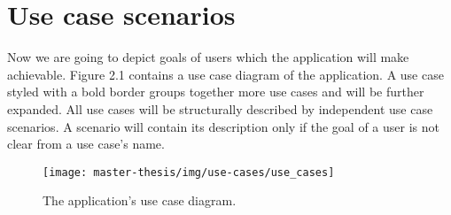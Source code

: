 \section{Use case scenarios}
Now we are going to depict goals of users which the application will make achievable.
Figure 2.1 contains a use case diagram of the application.
A use case styled with a bold border groups together more use cases and will be further expanded.
All use cases will be structurally described by independent use case scenarios.
A scenario will contain its description only if the goal of a user is not clear from a use case's name.

\begin{figure}[h]
  \texttt{[image: master-thesis/img/use-cases/use\_cases]}
  \caption{The application's use case diagram.}
\end{figure}

\newpage

\def\arraystretch{1.5}

